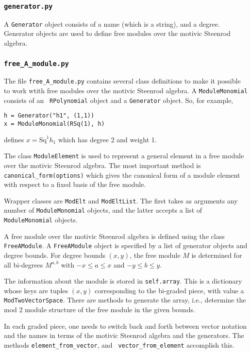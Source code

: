 \documentclass{article}
\newcommand{\Sq}{\mathrm{Sq}}
\begin{document}
\subsubsection{{\tt generator.py}}

A {\tt Generator} object consists of a name (which is a string), and a
degree. Generator objects are used to define free modules over the
motivic Steenrod algebra. 

\subsubsection{{\tt free\_A\_module.py}}

The file {\verb|free_A_module.py|} contains several class definitions
to make it possible to work wtith free modules over the motivic
Steenrod algebra. A {\tt ModuleMonomial} consists of an {\tt
  RPolynomial} object and a {\tt Generator} object. So, for example,
\begin{verbatim}
h = Generator("h1", (1,1))
x = ModuleMonomial(RSq(1), h)
\end{verbatim}
defines $x = \Sq^1 h_1$ which has degree 2 and weight 1.

The class {\tt ModuleElement} is used to represent a general element
in a free module over the motivic Steenrod algebra. The most important
method is {\tt canonical\_form(options)} which gives the canonical form
of a module element with respect to a fixed basis of the free module. 

Wrapper classes are {\tt ModElt} and {\tt ModEltList}. The first takes
as arguments any number of {\tt ModuleMonomial} objects, and the
latter accepts a list of {\tt ModuleMonomial} objects.

A free module over the motivic Steenrod algebra is defined using the
class {\tt FreeAModule}. A {\tt FreeAModule} object is specified by a
list of generator objects and degree bounds. For degree bounds
$(x,y)$, the free module $M$ is determined for all bi-degrees
$M^{a,b}$ with $-x \leq a \leq x$ and $-y \leq b \leq y$. 

The information about the module is stored in {\tt self.array}. This
is a dictionary whose keys are tuples $(x,y)$ corresponding to the
bi-graded piece, with value a {\tt ModTwoVectorSpace}. There are
methods to generate the array, i.e., determine the mod 2 module
structure of the free module in the given bounds. 

In each graded piece, one needs to switch back and forth between
vector notation and the names in terms of the motivic Steenrod algebra
and the generators. The methods {\tt element\_from\_vector}, and {\tt
  vector\_from\_element} accomplish this.
\end{document}
